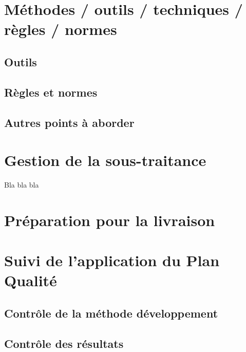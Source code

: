 \section{Méthodes / outils / techniques / règles / normes}
	\subsection{Outils}
	\subsection{Règles et normes}
	\subsection{Autres points à aborder}

\section{Gestion de la sous-traitance}
Bla bla bla

\section{Préparation pour la livraison}

\section{Suivi de l'application du Plan Qualité}
	\subsection{Contrôle de la méthode développement }
	\subsection{Contrôle des résultats}
